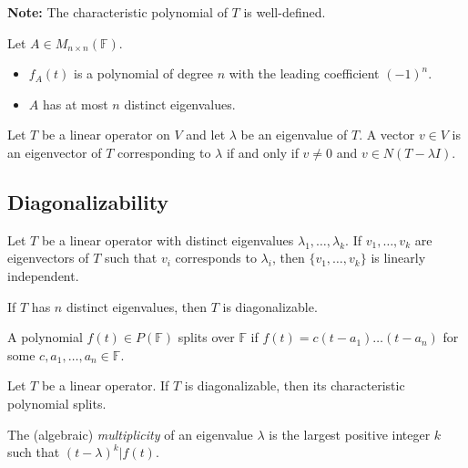 \documentclass[12pt]{article}
\newenvironment{theorem}[2][Theorem]{\begin{trivlist}
\item[\hskip \labelsep {\bfseries #1}\hskip \labelsep {\bfseries #2.}]}{\end{trivlist}}
\newenvironment{corollary}[2][Corollary]{\begin{trivlist}
\item[\hskip \labelsep {\bfseries #1}\hskip \labelsep {\bfseries #2}]}{\end{trivlist}}
\newenvironment{definition}[2][Definition]{\begin{trivlist}
\item[\hskip \labelsep {\bfseries #1}\hskip \labelsep {\bfseries #2}]}{\end{trivlist}}
\begin{document}
\noindent\textbf{Note:} The characteristic polynomial of $T$ is well-defined.

\begin{theorem}{5.3}
Let $A \in M_{n \times n}(\mathbb{F})$.

\begin{itemize}
    \item $f_A(t)$ is a polynomial of degree $n$ with the leading coefficient $(-1)^n$.
    
    \item $A$ has at most $n$ distinct eigenvalues.
\end{itemize}
\end{theorem}

\begin{theorem}{5.4}
Let $T$ be a linear operator on $V$ and let $\lambda$ be an eigenvalue of $T$. A vector $v \in V$ is an eigenvector of $T$ corresponding to $\lambda$ if and only if $v \neq 0$ and $v \in N(T - \lambda I)$.
\end{theorem}

\subsection{Diagonalizability}

\begin{theorem}{5.5}
Let $T$ be a linear operator with distinct eigenvalues $\lambda_1, \dots, \lambda_k$. If $v_1, \dots, v_k$ are eigenvectors of $T$ such that $v_i$ corresponds to $\lambda_i$, then $\{v_1, \dots, v_k\}$ is linearly independent. 
\end{theorem}

\begin{corollary}{6}
If $T$ has $n$ distinct eigenvalues, then $T$ is diagonalizable.
\end{corollary}

\begin{definition}{4}
A polynomial $f(t) \in P(\mathbb{F})$ splits over $\mathbb{F}$ if $f(t) = c(t - a_1) \dots (t - a_n)$ for some $c, a_1, \dots, a_n \in \mathbb{F}$.
\end{definition}

\begin{theorem}{5.6}
Let $T$ be a linear operator. If $T$ is diagonalizable, then its characteristic polynomial splits.
\end{theorem}

\begin{definition}{5}
The (algebraic) \textit{multiplicity} of an eigenvalue $\lambda$ is the largest positive integer $k$ such that $(t - \lambda)^k | f(t)$.
\end{definition}
\end{document}
